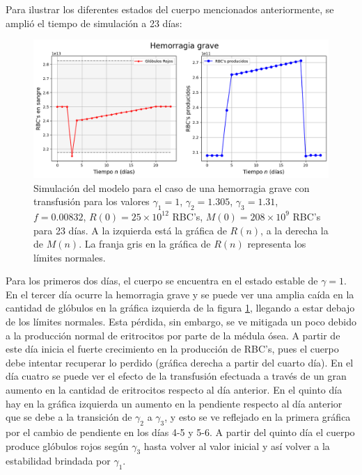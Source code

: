 Para ilustrar los diferentes estados del cuerpo mencionados anteriormente, se amplió el tiempo de simulación a 23 días: 

\begin{figure}[H]
    \centering
    \captionsetup{justification=centering}
    \includegraphics[scale=0.534]{figures/HemoGrave.png}
    \caption{Simulación del modelo para el caso de una hemorragia grave con transfusión para los valores $\gamma_1 = 1$, $\gamma_2=1.305$, $\gamma_3=1.31$, $f = 0.00832$, $R(0)=25\times 10^{12}$ RBC's, $M(0) = 208\times 10^{9}$ RBC's para 23 días. A la izquierda está la gráfica de $R(n)$, a la derecha la de $M(n)$. La franja gris en la gráfica de $R(n)$ representa los límites normales.}
    \label{sec:variaciones:fig:HemoGrave}
\end{figure}

Para los primeros dos días, el cuerpo se encuentra en el estado estable de $\gamma = 1$. En el tercer día ocurre la hemorragia grave y se puede ver una amplia caída en la cantidad de glóbulos en la gráfica izquierda de la figura \ref{sec:variaciones:fig:HemoGrave}, llegando a estar debajo de los límites normales. Esta pérdida, sin embargo, se ve mitigada un poco debido a la producción normal de eritrocitos por parte de la médula ósea. A partir de este día inicia el fuerte crecimiento en la producción de RBC's, pues el cuerpo debe intentar recuperar lo perdido (gráfica derecha a partir del cuarto día). En el día cuatro se puede ver el efecto de la transfusión efectuada a través de un gran aumento en la cantidad de eritrocitos respecto al día anterior. En el quinto día hay en la gráfica izquierda un aumento en la pendiente respecto al día anterior que se debe a la transición de $\gamma_2$ a $\gamma_3$, y esto se ve reflejado en la primera gráfica por el cambio de pendiente en los días 4-5 y 5-6. A partir del quinto día el cuerpo produce glóbulos rojos según $\gamma_3$ hasta volver al valor inicial y así volver a la estabilidad brindada por $\gamma_1$.

